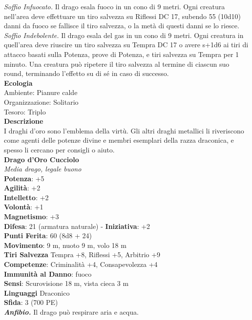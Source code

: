 \begin{multicols}{2}
\emph{Soffio Infuocato.} Il drago esala fuoco in un cono di 9 metri. Ogni creatura nell'area deve effettuare un tiro salvezza su Riflessi DC 17, subendo 55 (10d10) danni da fuoco se fallisce il tiro salvezza, o la metà di questi danni se lo riesce.\\
\emph{Soffio Indebolente.} Il drago esala del gas in un cono di 9 metri. Ogni creatura in quell'area deve riuscire un tiro salvezza su Tempra DC 17 o avere s+1d6 ai tiri di attacco basati sulla Potenza, prove di Potenza, e tiri salvezza su Tempra per 1 minuto. Una creatura può ripetere il tiro salvezza al termine di ciascun suo round, terminando l'effetto su di sé in caso di successo.\\
\textbf{Ecologia}\\
Ambiente: Pianure calde\\
Organizzazione: Solitario\\
Tesoro: Triplo\\
\textbf{Descrizione}\\
I draghi d'oro sono l'emblema della virtù. Gli altri draghi metallici li riveriscono come agenti delle potenze divine e membri esemplari della razza draconica, e spesso li cercano per consigli o aiuto.\\
\medskip\textbf{Drago d'Oro Cucciolo}\\
\emph{Media drago, legale buono}\\
\textbf{Potenza}: +5\\
\textbf{Agilità}: +2\\
\textbf{Intelletto}: +2\\
\textbf{Volontà}: +1\\
\textbf{Magnetismo}: +3\\
\textbf{Difesa}: 21 (armatura naturale) - \textbf{Iniziativa}: +2\\
\textbf{Punti Ferita}: 60 (8d8 + 24)\\
\textbf{Movimento}: 9 m, nuoto 9 m, volo 18 m\\
\textbf{Tiri Salvezza} Tempra +8, Riflessi +5, Arbitrio +9\\
\textbf{Competenze}: Criminalità +4, Consapevolezza +4\\
\textbf{Immunità al Danno}: fuoco\\
\textbf{Sensi}: Scurovisione 18 m, vista cieca 3 m \\
\textbf{Linguaggi} Draconico\\
\textbf{Sfida}: 3 (700 PE)\smallskip\\
\emph{\textbf{Anfibio.}} Il drago può respirare aria e acqua.\\

\end{multicols}
